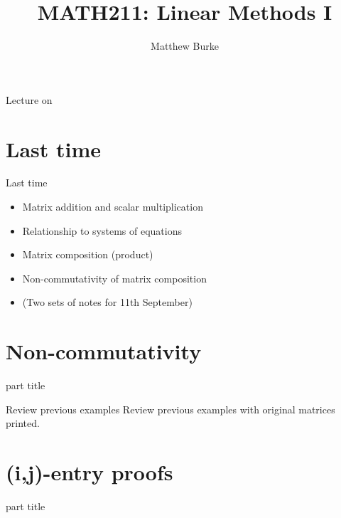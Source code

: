 \documentclass{beamer}
\title{MATH211: Linear Methods I}
\author{Matthew Burke}
\date{\formatdate{13}{09}{2018}}
\begin{document}
\frame{\titlepage}

\begin{frame}{Lecture on }
  \tableofcontents
\end{frame}

\section{Last time}
\label{sec:Last-time}

\begin{frame}{Last time}
  \begin{itemize}
  \item Matrix addition and scalar multiplication\vfill
  \item Relationship to systems of equations\vfill
  \item Matrix composition (product)\vfill
  \item Non-commutativity of matrix composition\vfill
  \item (Two sets of notes for 11th September)
  \end{itemize}
\end{frame}

\section{Non-commutativity}

\begin{frame}
  \begin{beamercolorbox}[sep=12pt,center]{part title}
    \insertsection\par
  \end{beamercolorbox}
\end{frame}

\begin{frame}{Review previous examples}
  Review previous examples with original matrices printed.
\end{frame}

\section{(i,j)-entry proofs}

\begin{frame}
  \begin{beamercolorbox}[sep=12pt,center]{part title}
    \insertsection\par
  \end{beamercolorbox}
\end{frame}
\end{document}
